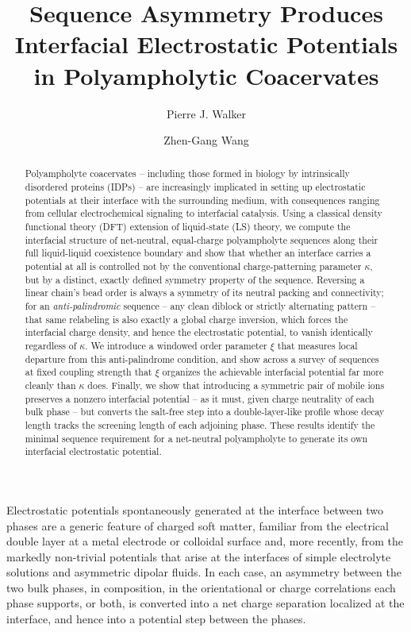 \documentclass[journal=amlccd,manuscript=article,layout=twocolumn]{achemso}
\author{Pierre J. Walker}
\affiliation{Division of Chemistry and Chemical Engineering, California Institute of Technology, Pasadena, California, USA}
\author{Zhen-Gang Wang}
\affiliation{Division of Chemistry and Chemical Engineering, California Institute of Technology, Pasadena, California, USA}
\title{Sequence Asymmetry Produces Interfacial Electrostatic Potentials in Polyampholytic Coacervates}
\begin{document}
\begin{abstract}
Polyampholyte coacervates -- including those formed in biology by intrinsically disordered proteins (IDPs) -- are increasingly implicated in setting up electrostatic potentials at their interface with the surrounding medium, with consequences ranging from cellular electrochemical signaling to interfacial catalysis. Using a classical density functional theory (DFT) extension of liquid-state (LS) theory, we compute the interfacial structure of net-neutral, equal-charge polyampholyte sequences along their full liquid-liquid coexistence boundary and show that whether an interface carries a potential at all is controlled not by the conventional charge-patterning parameter $\kappa$, but by a distinct, exactly defined symmetry property of the sequence. Reversing a linear chain's bead order is always a symmetry of its neutral packing and connectivity; for an \emph{anti-palindromic} sequence -- any clean diblock or strictly alternating pattern -- that same relabeling is also exactly a global charge inversion, which forces the interfacial charge density, and hence the electrostatic potential, to vanish identically regardless of $\kappa$. We introduce a windowed order parameter $\xi$ that measures local departure from this anti-palindrome condition, and show across a survey of sequences at fixed coupling strength that $\xi$ organizes the achievable interfacial potential far more cleanly than $\kappa$ does. Finally, we show that introducing a symmetric pair of mobile ions preserves a nonzero interfacial potential -- as it must, given charge neutrality of each bulk phase -- but converts the salt-free step into a double-layer-like profile whose decay length tracks the screening length of each adjoining phase. These results identify the minimal sequence requirement for a net-neutral polyampholyte to generate its own interfacial electrostatic potential.
\end{abstract}

\maketitle
Electrostatic potentials spontaneously generated at the interface between two phases are a generic feature of charged soft matter, familiar from the electrical double layer at a metal electrode or colloidal surface\cite{gouyConstitutionChargeElectrique1910,debyeZurTheorieElektrolyte1923} and, more recently, from the markedly non-trivial potentials that arise at the interfaces of simple electrolyte solutions and asymmetric dipolar fluids\cite{varnerStockmayerFluidShifted2026,walkerStockmayerFluidShifted2026a}. In each case, an asymmetry between the two bulk phases, in composition, in the orientational or charge correlations each phase supports, or both, is converted into a net charge separation localized at the interface, and hence into a potential step between the phases.
\end{document}
